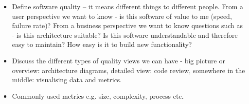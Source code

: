 
\begin{itemize}
	\item Define software quality – it  means different things to different people. From a user perspective we want to know - is this software of value to me (speed, failure rate)? From a business perspective we want to know questions such as - is this architecture suitable? Is this software understandable and therefore easy to maintain? How easy is it to build new functionality?
	\item Discuss the different types of quality views we can have - big picture or overview: architecture diagrams, detailed view: code review, somewhere in the middle: visualising data and metrics.
	\item Commonly used metrics e.g. size, complexity, process etc.
\end{itemize}



